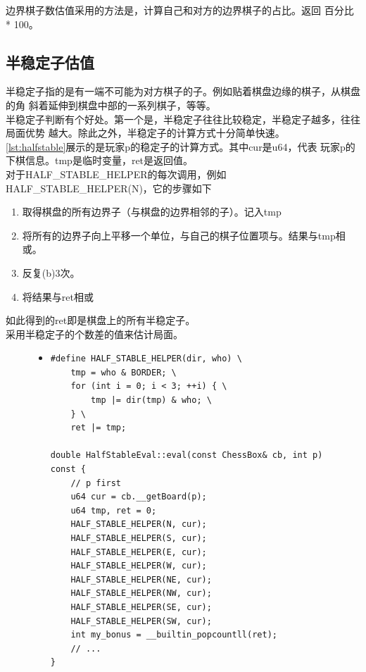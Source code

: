 \documentclass[a4paper]{article}
\begin{document}
边界棋子数估值采用的方法是，计算自己和对方的边界棋子的占比。返回
百分比 * 100。

\subsection{半稳定子估值}
半稳定子指的是有一端不可能为对方棋子的子。例如贴着棋盘边缘的棋子，从棋盘的角
斜着延伸到棋盘中部的一系列棋子，等等。\\

半稳定子判断有个好处。第一个是，半稳定子往往比较稳定，半稳定子越多，往往局面优势
越大。除此之外，半稳定子的计算方式十分简单快速。\\

\autoref{lst:halfstable}展示的是玩家p的稳定子的计算方式。其中cur是u64，代表
玩家p的下棋信息。tmp是临时变量，ret是返回值。\\

对于HALF\_STABLE\_HELPER的每次调用，例如HALF\_STABLE\_HELPER(N)，它的步骤如下
\begin{enumerate}[label=(\alph*)]
    \item 取得棋盘的所有边界子（与棋盘的边界相邻的子）。记入tmp
    \item 将所有的边界子向上平移一个单位，与自己的棋子位置项与。结果与tmp相或。
    \item 反复(b)3次。
    \item 将结果与ret相或
\end{enumerate}
如此得到的ret即是棋盘上的所有半稳定子。\\

采用半稳定子的个数差的值来估计局面。

\begin{figure}[!hbt]
\begin{itemize}
\item[] \begin{lstlisting}[style=mycpp, label=lst:halfstable, caption=半稳定子的计算方式]
#define HALF_STABLE_HELPER(dir, who) \
    tmp = who & BORDER; \
    for (int i = 0; i < 3; ++i) { \
        tmp |= dir(tmp) & who; \
    } \
    ret |= tmp;

double HalfStableEval::eval(const ChessBox& cb, int p) const {
    // p first
    u64 cur = cb.__getBoard(p);
    u64 tmp, ret = 0;
    HALF_STABLE_HELPER(N, cur);
    HALF_STABLE_HELPER(S, cur);
    HALF_STABLE_HELPER(E, cur);
    HALF_STABLE_HELPER(W, cur);
    HALF_STABLE_HELPER(NE, cur);
    HALF_STABLE_HELPER(NW, cur);
    HALF_STABLE_HELPER(SE, cur);
    HALF_STABLE_HELPER(SW, cur);
    int my_bonus = __builtin_popcountll(ret);
    // ...
}
\end{lstlisting}
\end{itemize}
\end{figure}
\end{document}
